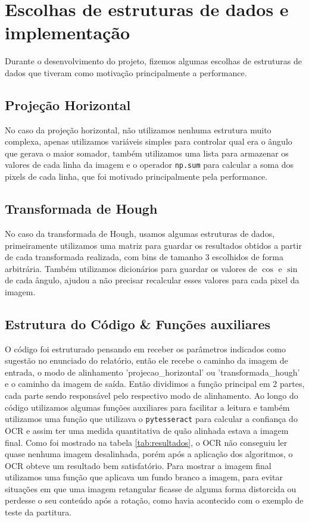 \documentclass{article}
\begin{document}
\section{Escolhas de estruturas de dados e implementação}
Durante o desenvolvimento do projeto, fizemos algumas escolhas de estruturas de dados que tiveram como motivação principalmente a performance.
\subsection{Projeção Horizontal}
No caso da projeção horizontal, não utilizamos nenhuma estrutura muito complexa, apenas utilizamos variáveis simples para controlar qual era o ângulo que gerava o maior somador, também utilizamos uma lista para armazenar os valores de cada linha da imagem e o operador \texttt{np.sum} para calcular a soma dos pixels de cada linha, que foi motivado principalmente pela performance.

\subsection{Transformada de Hough}
No caso da transformada de Hough, usamos algumas estruturas de dados, primeiramente utilizamos uma matriz para guardar os resultados obtidos a partir de cada transformada realizada, com bins de tamanho 3 escolhidos de forma arbitrária. Também utilizamos dicionários para guardar os valores de $\cos$ e $\sin$ de cada ângulo, ajudou a não precisar recalcular esses valores para cada pixel da imagem. 

\subsection{Estrutura do Código \& Funções auxiliares}
O código foi estruturado pensando em receber os parâmetros indicados como sugestão no enunciado do relatório, então ele recebe o caminho da imagem de entrada, o modo de alinhamento 'projecao\_horizontal' ou 'transformada\_hough' e o caminho da imagem de saída. Então dividimos a função principal em 2 partes, cada parte sendo responsável pelo respectivo modo de alinhamento. Ao longo do código utilizamos algumas funções auxiliares para facilitar a leitura e também utilizamos uma função que utilizava o \texttt{pytesseract} para calcular a confiança do OCR e assim ter uma medida quantitativa de quão alinhada estava a imagem final. Como foi mostrado na  tabela \ref{tab:resultados}, o OCR não conseguiu ler quase nenhuma imagem desalinhada, porém após a aplicação dos algoritmos, o OCR obteve um resultado bem satisfatório. Para mostrar a imagem final utilizamos uma função que aplicava um fundo branco a imagem, para evitar situações em que uma imagem retangular ficasse de alguma forma distorcida ou perdesse o seu conteúdo após a rotação, como havia acontecido com o exemplo de teste da partitura.
\end{document}
